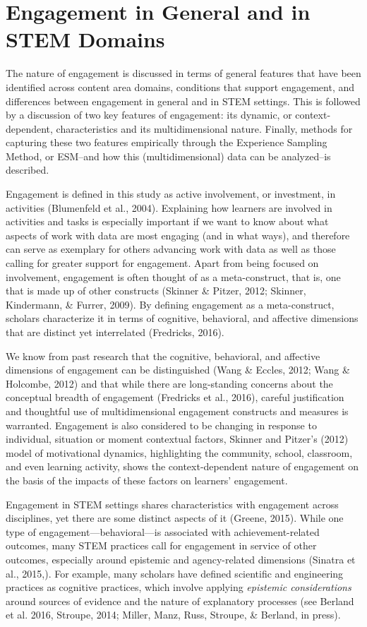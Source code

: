 \documentclass[]{msu-thesis}
\theoremstyle{definition}
\theoremstyle{definition}
\theoremstyle{definition}
\theoremstyle{remark}
\begin{document}
\section{Engagement in General and in STEM
Domains}\label{engagement-in-general-and-in-stem-domains}

The nature of engagement is discussed in terms of general features that
have been identified across content area domains, conditions that
support engagement, and differences between engagement in general and in
STEM settings. This is followed by a discussion of two key features of
engagement: its dynamic, or context-dependent, characteristics and its
multidimensional nature. Finally, methods for capturing these two
features empirically through the Experience Sampling Method, or ESM--and
how this (multidimensional) data can be analyzed--is described.

Engagement is defined in this study as active involvement, or
investment, in activities (Blumenfeld et al., 2004). Explaining how
learners are involved in activities and tasks is especially important if
we want to know about what aspects of work with data are most engaging
(and in what ways), and therefore can serve as exemplary for others
advancing work with data as well as those calling for greater support
for engagement. Apart from being focused on involvement, engagement is
often thought of as a meta-construct, that is, one that is made up of
other constructs (Skinner \& Pitzer, 2012; Skinner, Kindermann, \&
Furrer, 2009). By defining engagement as a meta-construct, scholars
characterize it in terms of cognitive, behavioral, and affective
dimensions that are distinct yet interrelated (Fredricks, 2016).

We know from past research that the cognitive, behavioral, and affective
dimensions of engagement can be distinguished (Wang \& Eccles, 2012;
Wang \& Holcombe, 2012) and that while there are long-standing concerns
about the conceptual breadth of engagement (Fredricks et al., 2016),
careful justification and thoughtful use of multidimensional engagement
constructs and measures is warranted. Engagement is also considered to
be changing in response to individual, situation or moment contextual
factors, Skinner and Pitzer's (2012) model of motivational dynamics,
highlighting the community, school, classroom, and even learning
activity, shows the context-dependent nature of engagement on the basis
of the impacts of these factors on learners' engagement.

Engagement in STEM settings shares characteristics with engagement
across disciplines, yet there are some distinct aspects of it (Greene,
2015). While one type of engagement---behavioral---is associated with
achievement-related outcomes, many STEM practices call for engagement in
service of other outcomes, especially around epistemic and
agency-related dimensions (Sinatra et al., 2015,). For example, many
scholars have defined scientific and engineering practices as cognitive
practices, which involve applying \emph{epistemic considerations} around
sources of evidence and the nature of explanatory processes (see Berland
et al. 2016, Stroupe, 2014; Miller, Manz, Russ, Stroupe, \& Berland, in
press).
\end{document}
